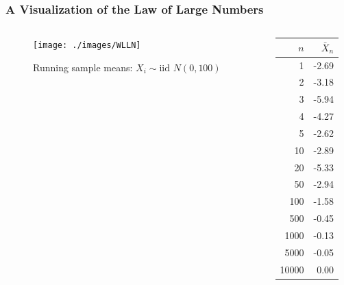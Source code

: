 \begin{frame}
\frametitle{A Visualization of the Law of Large Numbers}
\begin{columns} 
\begin{column}[c]{8cm} 
\begin{figure}
\centering
\texttt{[image: ./images/WLLN]}
\caption{Running sample means: $X_i \sim \mbox{iid } N(0, 100)$}
\end{figure}
\end{column} 
\begin{column}[c]{3cm} 

\footnotesize
\begin{table}
\begin{tabular}{|rr|}
\hline
$n$&$\bar{X}_n$\\
\hline
1 &-2.69\\
2 &-3.18\\
3 &-5.94\\
4 &-4.27\\
5 &-2.62\\
10& -2.89\\
20& -5.33\\
50 &-2.94\\
100& -1.58\\
500 &-0.45\\
1000& -0.13\\
5000& -0.05\\
10000&  0.00\\
\hline
\end{tabular}
\end{table}

\end{column} 
\end{columns} 


\end{frame}
